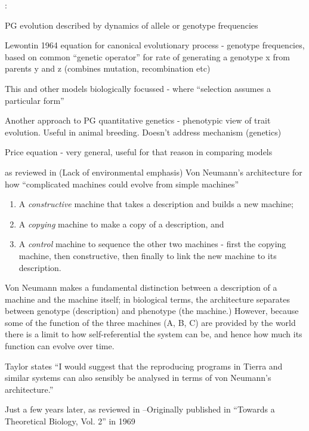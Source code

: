 \autocite{Paixao2015}:
		
		PG evolution described by dynamics of allele or genotype frequencies
	
		Lewontin 1964 equation for canonical evolutionary process - genotype
		frequencies, based on common ``genetic operator'' for rate of
		generating a genotype x from parents y and z (combines mutation,
		recombination etc)

		This and other models biologically focussed - where ``selection
		assumes a particular form''

		Another approach to PG quantitative genetics - phenotypic view of
		trait evolution. Useful in animal breeding. Doesn't address
		mechanism (genetics)

		Price equation - very general, useful for that reason in comparing
		models

\autocite{VonNeumann1966} as reviewed in \autocite{Taylor1999} (Lack of environmental emphasis)
Von Neumann's architecture for how ``complicated machines could evolve from simple machines''

\begin{enumerate}[label=\Alph*]
	\item A \emph{constructive} machine that takes a description and builds a new machine;
	\item A \emph{copying} machine to make a copy of a description, and 
	\item A \emph{control} machine to sequence the other two machines - first the copying machine, then constructive, then finally to link the new machine to its description.
\end{enumerate}

Von Neumann makes a fundamental distinction between a description of a machine and the machine itself; in biological terms, the architecture separates between genotype (description) and phenotype (the machine.) However, because some of the function of the three machines (A, B, C) are provided by the world there is a limit to how self-referential the system can be, and hence how much its function can evolve over time.

Taylor states ``I would suggest that the reproducing programs in Tierra and similar systems can also sensibly be analysed in terms of von Neumann's architecture.''

Just a few years later, 
\autocite{Waddington2008} as reviewed in \autocite{Taylor:1999sc}--Originally published in ``Towards a Theoretical Biology, Vol. 2'' in 1969

